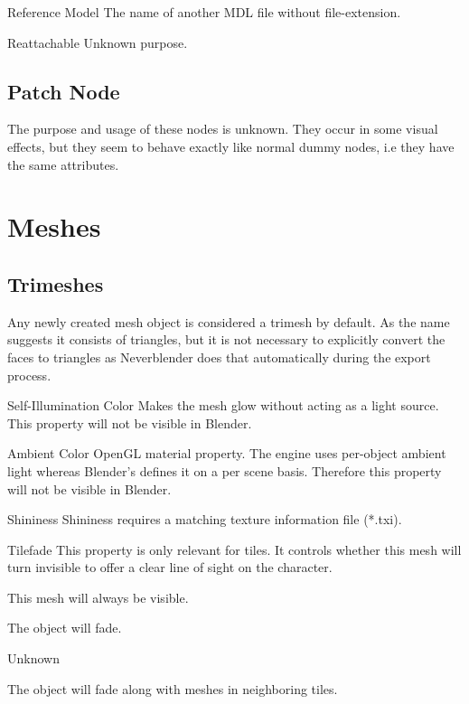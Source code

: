 \begin{propertyAurora}{Reference Model}
The name of another MDL file without file-extension.
\end{propertyAurora}

\begin{propertyAurora}{Reattachable}
Unknown purpose.
\end{propertyAurora}

\subsection{Patch Node}
The purpose and usage of these nodes is unknown. They occur in some visual effects, but
they seem to behave exactly like normal dummy nodes, i.e they have the same
attributes.

\section{Meshes}

\subsection{Trimeshes}

Any newly created mesh object is considered a trimesh by default. As the name 
suggests it consists of triangles, but it is not necessary to explicitly 
convert the faces to triangles as Neverblender does that automatically 
during the export process.

\begin{propertyAurora}{Self-Illumination Color}
Makes the mesh glow without acting as a light source.
This property will not be visible in Blender.
\end{propertyAurora}

\begin{propertyAurora}{Ambient Color}
OpenGL material property. The engine uses per-object ambient light whereas Blender's 
defines it on a per scene basis. Therefore this property will not be visible in Blender.
\end{propertyAurora}

\begin{propertyAurora}{Shininess}
Shininess requires a matching texture information file (*.txi).
\end{propertyAurora}

\begin{propertyAurora}{Tilefade}
This property is only relevant for tiles. It controls whether this 
mesh will turn invisible to offer a clear line of sight on the character.
\begin{description}[leftmargin=6em,style=nextline]
    \item[None] This mesh will always be visible.
    \item[Fade] The object will fade.
    \item[Base] Unknown
    \item[Neighbor] The object will fade along with meshes in neighboring tiles.
\end{description}
\end{propertyAurora}


